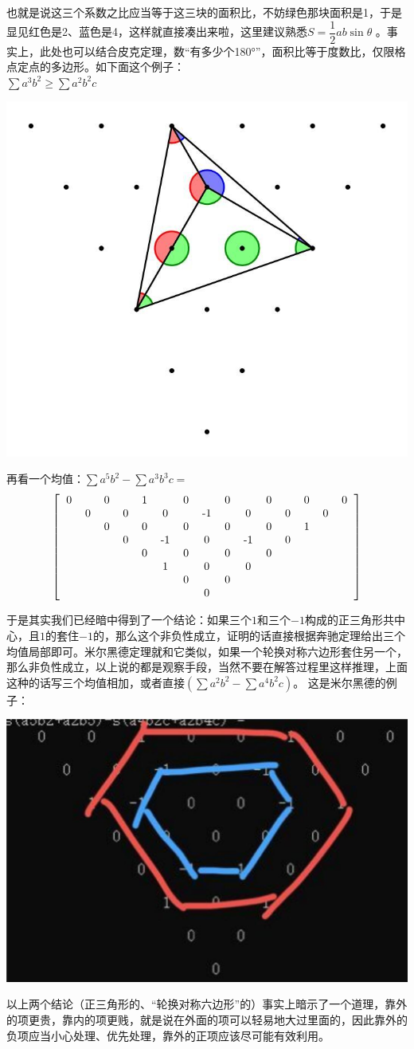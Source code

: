 \documentclass[UTF8]{ctexart}
\begin{document}
也就是说这三个系数之比应当等于这三块的面积比，不妨绿色那块面积是1，于是显见红色是2、蓝色是4，这样就直接凑出来啦，这里建议熟悉$ S=\displaystyle \dfrac{1}{2}ab  \sin \theta $
。事实上，此处也可以结合皮克定理，数“有多少个180°”，面积比等于度数比，仅限格点定点的多边形。如下面这个例子：\\
$ \displaystyle  \sum a^{3} b^{2} \geq \displaystyle  \sum a^{2} b^{2} c $

\begin{center}
	\includegraphics[width=0.4\linewidth]{14}
\end{center}

再看一个均值：$ \displaystyle  \sum a^{5}b^{2}-\displaystyle  \sum a^{3}b^{3}c= $
\renewcommand*{\arraystretch}{1.732}\[\left[\begin{matrix}
	\begin{tabular}{ccccccccccccccc}
		0& &0& &1& &0& &0& &0& &0& &0\\
		&0& &0& &0& &-1& &0& &0& &0&\\
		& &0& &0& &0& &0& &0& &1& &\\
		& & &0& &-1& &0& &-1& &0& & &\\
		& & & &0& &0& &0& &0& & & &\\
		& & & & &1& &0& &0& & & & &\\
		& & & & & &0& &0& & & & & &\\
		& & & & & & &0& & & & & & &\\
	\end{tabular}
\end{matrix}\right]\]


于是其实我们已经暗中得到了一个结论：如果三个$ 1 $和三个$ -1 $构成的正三角形共中心，且$ 1 $的套住$ -1 $的，那么这个非负性成立，证明的话直接根据奔驰定理给出三个均值局部即可。米尔黑德定理就和它类似，如果一个轮换对称六边形套住另一个，那么非负性成立，以上说的都是观察手段，当然不要在解答过程里这样推理，上面这种的话写三个均值相加，或者直接$ (\displaystyle \sum a^{2}b^{2}-\displaystyle \sum a^{4}b^{2}c) $。
这是米尔黑德的例子：
\begin{center}
	\includegraphics[width=0.45\linewidth]{16}
\end{center}
以上两个结论（正三角形的、“轮换对称六边形”的）事实上暗示了一个道理，靠外的项更贵，靠内的项更贱，就是说在外面的项可以轻易地大过里面的，因此靠外的负项应当小心处理、优先处理，靠外的正项应该尽可能有效利用。\\
\end{document}
